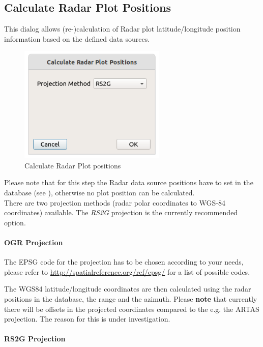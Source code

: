 \subsection{Calculate Radar Plot Positions}
\label{sec:ui_proc_radar_plot_pos}

This dialog allows (re-)calculation of Radar plot latitude/longitude position information based on the defined data sources.

\begin{figure}[H]
  \center
    \includegraphics[width=7cm]{figures/proc_calc_radar.png}
  \caption{Calculate Radar Plot positions}
\end{figure}

Please note that for this step the Radar data source positions have to set in the database (see ), otherwise no plot position can be calculated.  \\

There are two projection methods (radar polar coordinates to WGS-84 coordinates) available. The \textit{RS2G} projection is the currently recommended option.

\paragraph{OGR Projection}

The EPSG code for the projection has to be chosen according to your needs, please refer to \url{http://spatialreference.org/ref/epsg/} for a list of possible codes.

The WGS84 latitude/longitude coordinates are then calculated using the radar positions in the database, the range and the azimuth. Please \textbf{note} that currently there will be offsets in the projected coordinates compared to the e.g. the ARTAS projection. The reason for this is under investigation.

\paragraph{RS2G Projection}

